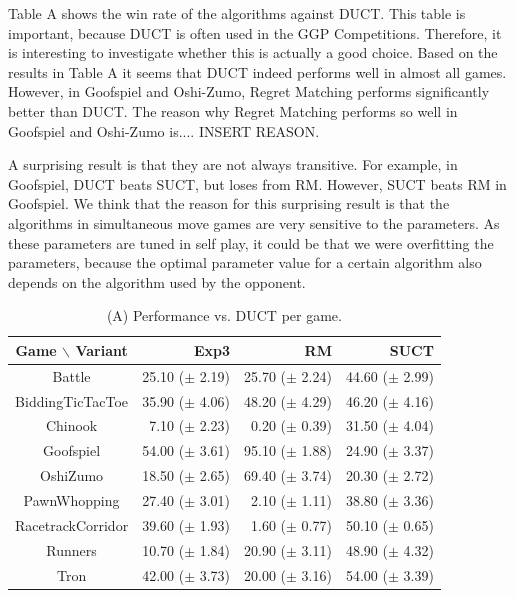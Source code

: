 \documentclass[conference]{IEEEtran}
\begin{document}
Table A shows the win rate of the algorithms against DUCT. This table is important, because DUCT is often used in the GGP Competitions. Therefore, it is interesting to investigate whether this is actually a good choice. Based on the results in Table A it seems that DUCT indeed performs well in almost all games. However, in Goofspiel and Oshi-Zumo, Regret Matching performs significantly better than DUCT. The reason why Regret Matching performs so well in Goofspiel and Oshi-Zumo is.... INSERT REASON. 

A surprising result is that they are not always transitive. For example, in Goofspiel, DUCT beats SUCT, but loses from RM. However, SUCT beats RM in Goofspiel. We think that the reason for this surprising result is that the algorithms in simultaneous move games are very sensitive to the parameters. As these parameters are tuned in self play, it could be that we were overfitting the parameters, because the optimal parameter value for a certain algorithm also depends on the algorithm used by the opponent. 

\begin{table}
\begin{center}
\begin{tabular}{|c|rrr|}
\hline
 Game $\backslash$ Variant    & Exp3		 & RM		 & SUCT		\\ 
\hline
                   Battle     & 25.10 ($\pm$ 2.19)	& 25.70 ($\pm$ 2.24)	& 44.60 ($\pm$ 2.99)	\\ 
         BiddingTicTacToe     & 35.90 ($\pm$ 4.06)	& 48.20 ($\pm$ 4.29)	& 46.20 ($\pm$ 4.16)	\\ 
                  Chinook     & 7.10 ($\pm$ 2.23)	& 0.20 ($\pm$ 0.39)	& 31.50 ($\pm$ 4.04)	\\ 
                Goofspiel     & 54.00 ($\pm$ 3.61)	& 95.10 ($\pm$ 1.88)	& 24.90 ($\pm$ 3.37)	\\ 
                 OshiZumo     & 18.50 ($\pm$ 2.65)	& 69.40 ($\pm$ 3.74)	& 20.30 ($\pm$ 2.72)	\\ 
             PawnWhopping     & 27.40 ($\pm$ 3.01)	& 2.10 ($\pm$ 1.11)	& 38.80 ($\pm$ 3.36)	\\ 
        RacetrackCorridor     & 39.60 ($\pm$ 1.93)	& 1.60 ($\pm$ 0.77)	& 50.10 ($\pm$ 0.65)	\\ 
                  Runners     & 10.70 ($\pm$ 1.84)	& 20.90 ($\pm$ 3.11)	& 48.90 ($\pm$ 4.32)	\\ 
                     Tron     & 42.00 ($\pm$ 3.73)	& 20.00 ($\pm$ 3.16)	& 54.00 ($\pm$ 3.39)	\\ 
\hline
\end{tabular}
\end{center}
\caption{(A) Performance vs. DUCT per game.}
\end{table}
\end{document}
